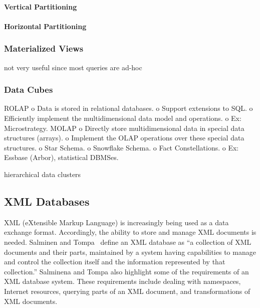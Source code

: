 \documentclass[12pt,a4paper]{article}
\begin{document}
\paragraph{Vertical Partitioning}

\paragraph{Horizontal Partitioning}

\subsubsection{Materialized Views}
not very useful since most queries are ad-hoc \cite{653447}
\cite{355309}

\subsubsection{Data Cubes}
\cite{Cheung20011}
ROLAP
          o Data is stored in relational databases.
          o Support extensions to SQL.
          o Efficiently implement the multidimensional data model and operations.
          o Ex: Microstrategy.
MOLAP
          o Directly store multidimensional data in special data structures (arrays).
          o Implement the OLAP operations over these special data structures.
          o Star Schema.
          o Snowflake Schema. \cite{kimball2009data}
          o Fact Constellations.
          o Ex: Essbase (Arbor), statistical DBMSes.

hierarchical data clusters \cite{karayannidis2008hierarchical}

\subsection{XML Databases}
\label{SEC-XML}

XML (eXtensible Markup Language) is increasingly being used as a data exchange format. Accordingly, the ability to store and manage XML documents is needed.
Salminen and Tompa~\cite{salminen2001requirements} define an XML database as ``a collection of XML documents and their parts, maintained by a system
having capabilities to manage and control the collection itself and the information represented by that collection.'' Salminena and Tompa also highlight some of
the requirements of an XML database system. These requirements include dealing with namespaces, Internet resources, querying parts of an XML document, and
transformations of XML documents.
\end{document}
